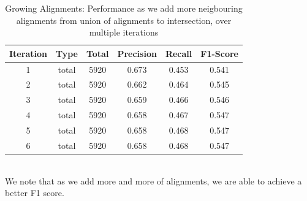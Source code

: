 \documentclass{article}
\begin{document}
		\begin{table}[htbp]
			\center
			\begin{tabular}{|c|c|c|c|c|c|}
				\hline
				Iteration&Type&Total&Precision&Recall&F1-Score\\
				\hline
				1&total&        5920&     0.673&        0.453&        0.541\\
				\hline
				2&total&        5920&     0.662&        0.464&        0.545\\
				\hline
				3&total&        5920&     0.659&        0.466&        0.546\\
				\hline
				4&total&        5920&     0.658&        0.467&        0.547\\
				\hline
				5&total&        5920&     0.658&        0.468&        0.547\\
				\hline
				6&total&        5920&     0.658&        0.468&        0.547\\

				\hline
			\end{tabular}
			\caption{Growing Alignments: Performance as we add more neigbouring alignments from union of alignments to intersection, over multiple iterations}
		\end{table}
		\\We note that as we add more and more of alignments, we are able to achieve a better F1 score.
\end{document}
